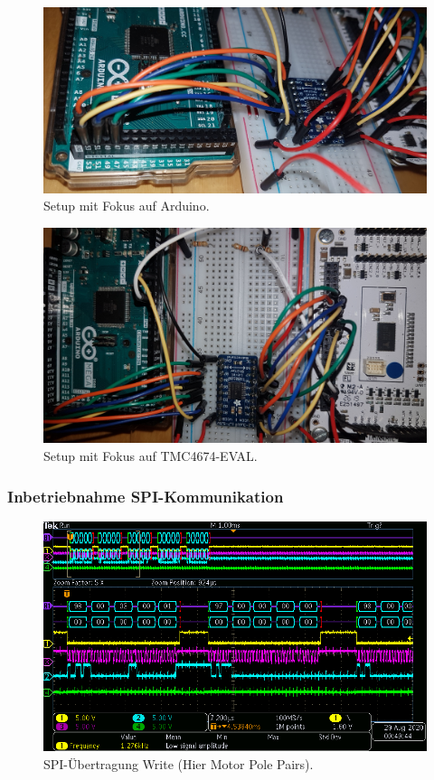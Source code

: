\begin{appendix}
\begin{figure}[h!]
	\centering
	\includegraphics[angle = 270,width=\textwidth]{graphics/2_Arduino}
	\caption{Setup mit Fokus auf Arduino.}
	\label{fig:2_Arduino}
\end{figure}

\begin{figure}[h!]
	\centering
	\includegraphics[angle = 180,width=\textwidth]{graphics/2_EVAL}
	\caption{Setup mit Fokus auf TMC4674-EVAL.}
	\label{fig:2_EVAL}
\end{figure}

\newpage

\subsubsection{Inbetriebnahme SPI-Kommunikation}\label{Appendix:TMC4671_SPI}

\begin{figure}[h!]
\center
\includegraphics[width = \textwidth]{graphics/TMC4671_Beschreiben_1}
\caption{SPI-Übertragung Write (Hier Motor Pole Pairs).}
\label{fig:TMC4671_Lesen_1}
\end{figure}


\end{appendix}
